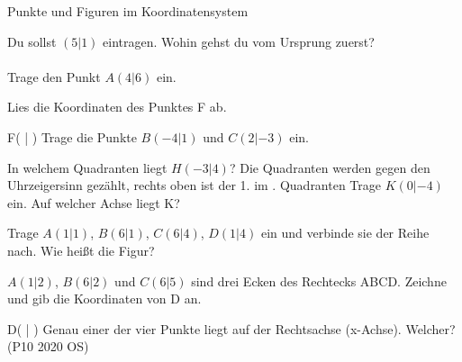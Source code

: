 \begin{aufgabe}{Punkte und Figuren im Koordinatensystem}
\begin{teile}
\teil Du sollst $(5|1)$ eintragen. Wohin gehst du vom Ursprung zuerst? \\  \\ 
\teil Trage den Punkt $A(4|6)$ ein.

\begin{ksys}[xmin=0,xmax=8,ymin=0,ymax=8] \end{ksys}
\teil Lies die Koordinaten des Punktes F ab.

\begin{ksys}[xmin=0,xmax=8,ymin=0,ymax=8]  \end{ksys}
F( \leerfeld | \leerfeld )
\teil Trage die Punkte $B(-4|1)$ und $C(2|-3)$ ein.

\begin{ksys}[xmin=-6,xmax=6,ymin=-6,ymax=6] \end{ksys}
\teil In welchem Quadranten liegt $H(-3|4)$? Die Quadranten werden gegen den Uhrzeigersinn gezählt, rechts oben ist der 1. im \leerfeld . Quadranten
\teil Trage $K(0|-4)$ ein. Auf welcher Achse liegt K?

\begin{ksys}[xmin=-6,xmax=6,ymin=-6,ymax=6] \end{ksys}
\teil Trage $A(1|1)$, $B(6|1)$, $C(6|4)$, $D(1|4)$ ein und verbinde sie der Reihe nach. Wie heißt die Figur?

\begin{ksys}[xmin=0,xmax=8,ymin=0,ymax=8] \end{ksys}
\teil $A(1|2)$, $B(6|2)$ und $C(6|5)$ sind drei Ecken des Rechtecks ABCD. Zeichne und gib die Koordinaten von D an.

\begin{ksys}[xmin=-5,xmax=7,ymin=-5,ymax=7] \end{ksys}
D( \leerfeld | \leerfeld )
\teil Genau einer der vier Punkte liegt auf der Rechtsachse (x-Achse). Welcher? \hfill (P10 2020 OS) \\  \\  \\  \\ 
\end{teile}
\end{aufgabe}

